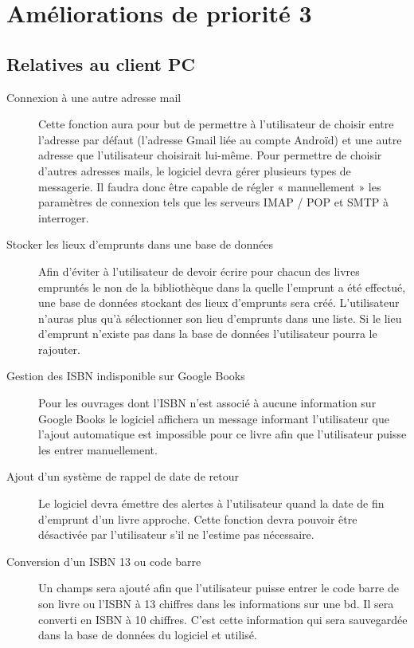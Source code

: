 \section{Améliorations de priorité 3}

\subsection{Relatives au client PC}

\begin{description}
\item[Connexion à une autre adresse mail]
	Cette fonction aura pour but de permettre à l'utilisateur de choisir entre l'adresse par défaut (l'adresse Gmail liée au compte Androïd) et une autre adresse que l'utilisateur choisirait lui-même. 
	Pour permettre de choisir d'autres adresses mails, le logiciel devra gérer plusieurs types de messagerie.
	Il faudra donc être capable de régler « manuellement » les paramètres de connexion tels que les serveurs IMAP / POP et SMTP à interroger.

\item[Stocker les lieux d'emprunts dans une base de données]
	Afin d'éviter à l'utilisateur de devoir écrire pour chacun des livres empruntés le non de la bibliothèque dans la quelle l'emprunt a été effectué, une base de données stockant des lieux d'emprunts sera créé. 
	L'utilisateur n'auras plus qu'à sélectionner son lieu d'emprunts dans une liste. 
	Si le lieu d'emprunt n'existe pas dans la base de données l'utilisateur pourra le rajouter.

\item[Gestion des ISBN indisponible sur Google Books]
	Pour les ouvrages dont l'ISBN n'est associé à aucune information sur Google Books le logiciel affichera un message informant l'utilisateur que l'ajout automatique est impossible pour ce livre afin que l'utilisateur puisse les entrer manuellement.   

\item[Ajout d'un système de rappel de date de retour]
	Le logiciel devra émettre des alertes à l'utilisateur quand la date de fin d'emprunt d'un livre approche. 
	Cette fonction devra pouvoir être désactivée par l'utilisateur s'il ne l'estime pas nécessaire.

\item[Conversion d'un ISBN 13 ou code barre]
	Un champs sera ajouté afin que l'utilisateur puisse entrer le code barre de son livre ou l'ISBN à 13 chiffres dans les informations sur une bd. Il sera converti en ISBN à 10 chiffres. C'est cette information qui sera sauvegardée dans la base de données du logiciel et utilisé.

\end{description}

